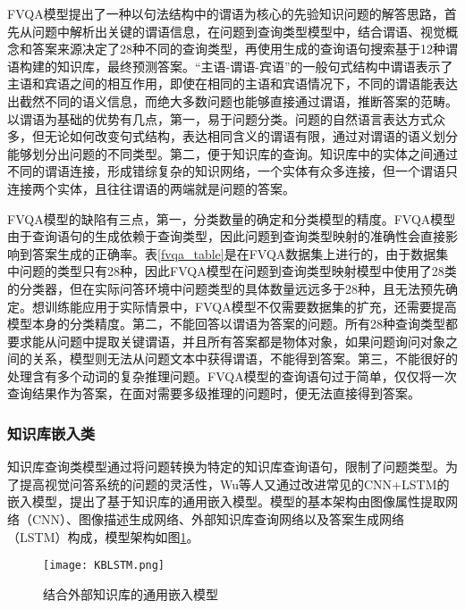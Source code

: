 FVQA模型提出了一种以句法结构中的谓语为核心的先验知识问题的解答思路，首先从问题中解析出关键的谓语信息，在问题到查询类型模型中，结合谓语、视觉概念和答案来源决定了28种不同的查询类型，再使用生成的查询语句搜索基于12种谓语构建的知识库，最终预测答案。“主语-谓语-宾语”的一般句式结构中谓语表示了主语和宾语之间的相互作用，即使在相同的主语和宾语情况下，不同的谓语能表达出截然不同的语义信息，而绝大多数问题也能够直接通过谓语，推断答案的范畴。以谓语为基础的优势有几点，第一，易于问题分类。问题的自然语言表达方式众多，但无论如何改变句式结构，表达相同含义的谓语有限，通过对谓语的语义划分能够划分出问题的不同类型。第二，便于知识库的查询。知识库中的实体之间通过不同的谓语连接，形成错综复杂的知识网络，一个实体有众多连接，但一个谓语只连接两个实体，且往往谓语的两端就是问题的答案。

FVQA模型的缺陷有三点，第一，分类数量的确定和分类模型的精度。FVQA模型由于查询语句的生成依赖于查询类型，因此问题到查询类型映射的准确性会直接影响到答案生成的正确率。表\ref{fvqa_table}是在FVQA数据集上进行的，由于数据集中问题的类型只有28种，因此FVQA模型在问题到查询类型映射模型中使用了28类的分类器，但在实际问答环境中问题类型的具体数量远远多于28种，且无法预先确定。想训练能应用于实际情景中，FVQA模型不仅需要数据集的扩充，还需要提高模型本身的分类精度。第二，不能回答以谓语为答案的问题。所有28种查询类型都要求能从问题中提取关键谓语，并且所有答案都是物体对象，如果问题询问对象之间的关系，模型则无法从问题文本中获得谓语，不能得到答案。第三，不能很好的处理含有多个动词的复杂推理问题。FVQA模型的查询语句过于简单，仅仅将一次查询结果作为答案，在面对需要多级推理的问题时，便无法直接得到答案。

\subsubsection{知识库嵌入类}

知识库查询类模型通过将问题转换为特定的知识库查询语句，限制了问题类型。为了提高视觉问答系统的问题的灵活性，Wu等人又通过改进常见的CNN+LSTM的嵌入模型，提出了基于知识库的通用嵌入模型。模型的基本架构由图像属性提取网络（CNN）、图像描述生成网络、外部知识库查询网络以及答案生成网络（LSTM）构成，模型架构如图\ref{KBLSTM}。
\begin{figure}[H]
	\centering
	\texttt{[image: KBLSTM.png]}
	\caption{结合外部知识库的通用嵌入模型}
	\label{KBLSTM}
\end{figure}

